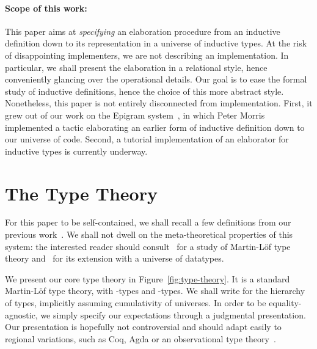 \documentclass{scrartcl}
\theoremstyle{plain}
\theoremstyle{definition}
\begin{document}
\paragraph{Scope of this work:} 

This paper aims at \emph{specifying} an elaboration procedure from an
inductive definition down to its representation in a universe of
inductive types. At the risk of disappointing implementers, we are
not describing an implementation. In particular, we shall present the
elaboration in a relational style, hence conveniently glancing over
the operational details. Our goal is to ease the formal study of
inductive definitions, hence the choice of this more abstract style.
Nonetheless, this paper is not entirely disconnected from
implementation. First, it grew out of our work on the Epigram
system~\citep{pigs:epigram}, in which Peter Morris implemented a
tactic elaborating an earlier form of inductive definition down to our
universe of code. Second, a tutorial implementation of an elaborator
for inductive types is currently underway.



\section{The Type Theory}
\label{sec:type-theory}



For this paper to be self-contained, we shall recall a few definitions
from our previous work~\citep{dagand:levitation}. We shall not dwell
on the meta-theoretical properties of this system: the interested
reader should consult~\citet{luo:utt} for a study of Martin-L\"{o}f
type theory and~\citet{dagand:levitation} for its extension with a
universe of datatypes.



We present our core type theory in Figure~\ref{fig:type-theory}. It is
a standard Martin-L\"{o}f type theory, with -types and
-types. We shall write  for the hierarchy of types,
implicitly assuming cumulativity of universes. In order to be
equality-agnostic, we simply specify our expectations through a
judgmental presentation. Our presentation is hopefully not
controversial and should adapt easily to regional variations, such as
Coq, Agda or an observational type theory~\citep{altenkirch:ott}.
\end{document}

